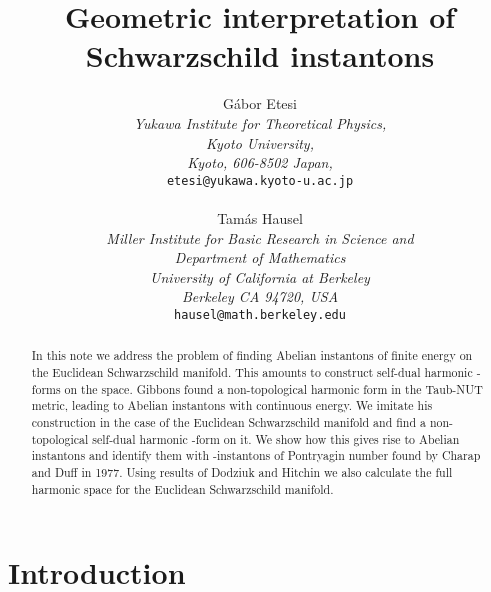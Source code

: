 \documentclass[a4paper,12pt,draft]{article}
\begin{document}
\thispagestyle{empty}

\title{Geometric interpretation of Schwarzschild instantons}

\author{ 
G\'abor Etesi
\\ {\it Yukawa Institute for Theoretical Physics,}
\\ {\it  Kyoto University,} 
\\{\it Kyoto, 606-8502 Japan,} 
\\ {\tt etesi@yukawa.kyoto-u.ac.jp}
\\
\\ Tam\'as Hausel 
\\ {\it Miller Institute for Basic Research in Science and}\\
{\it Department of Mathematics}
\\ {\it University of California at Berkeley} 
\\ {\it Berkeley CA 94720, USA}\\ 
{\tt hausel@math.berkeley.edu} }

\maketitle

\begin{abstract} In this note we address the problem of finding 
Abelian instantons of finite energy on the Euclidean Schwarzschild
manifold. This amounts to construct self-dual 
\coordHE{} harmonic \coordHE{}-forms on the space. Gibbons found a non-topological \coordHE{} 
harmonic form in the Taub-NUT metric, leading to Abelian instantons with 
continuous energy.
We imitate his construction in the case of the Euclidean Schwarzschild
 manifold and find a non-topological self-dual \coordHE{} harmonic \coordHE{}-form on it.
 We show how this gives rise to Abelian instantons and identify them 
with \coordHE{}-instantons of Pontryagin number \coordHE{}
found by Charap and Duff in 1977. Using results of Dodziuk and Hitchin we 
also calculate the full \coordHE{} harmonic space for the
Euclidean Schwarzschild manifold. 
 \end{abstract}

\thispagestyle{empty}

\newpage


\section{Introduction} 
\end{document}
